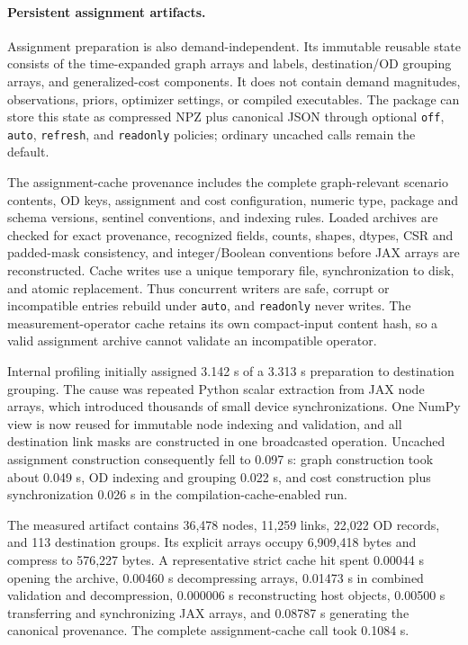 \paragraph{Persistent assignment artifacts.}
Assignment preparation is also demand-independent. Its immutable reusable state
consists of the time-expanded graph arrays and labels, destination/OD grouping
arrays, and generalized-cost components. It does not contain demand magnitudes,
observations, priors, optimizer settings, or compiled executables. The package
can store this state as compressed NPZ plus canonical JSON through optional
\texttt{off}, \texttt{auto}, \texttt{refresh}, and \texttt{readonly} policies;
ordinary uncached calls remain the default.

The assignment-cache provenance includes the complete graph-relevant scenario
contents, OD keys, assignment and cost configuration, numeric type, package and
schema versions, sentinel conventions, and indexing rules. Loaded archives are
checked for exact provenance, recognized fields, counts, shapes, dtypes, CSR and
padded-mask consistency, and integer/Boolean conventions before JAX arrays are
reconstructed. Cache writes use a unique temporary file, synchronization to
disk, and atomic replacement. Thus concurrent writers are safe, corrupt or
incompatible entries rebuild under \texttt{auto}, and \texttt{readonly} never
writes. The measurement-operator cache retains its own compact-input content
hash, so a valid assignment archive cannot validate an incompatible operator.

Internal profiling initially assigned 3.142 s of a 3.313 s preparation to
destination grouping. The cause was repeated Python scalar extraction from JAX
node arrays, which introduced thousands of small device synchronizations. One
NumPy view is now reused for immutable node indexing and validation, and all
destination link masks are constructed in one broadcasted operation. Uncached
assignment construction consequently fell to 0.097 s: graph construction took
about 0.049 s, OD indexing and grouping 0.022 s, and cost construction plus
synchronization 0.026 s in the compilation-cache-enabled run.

The measured artifact contains 36,478 nodes, 11,259 links, 22,022 OD records, and 113
destination groups. Its explicit arrays occupy 6,909,418 bytes and compress to
576,227 bytes. A representative strict cache hit spent 0.00044 s opening the
archive, 0.00460 s decompressing arrays, 0.01473 s in combined validation and
decompression, 0.000006 s reconstructing host objects, 0.00500 s transferring
and synchronizing JAX arrays, and 0.08787 s generating the canonical provenance.
The complete assignment-cache call took 0.1084 s.

